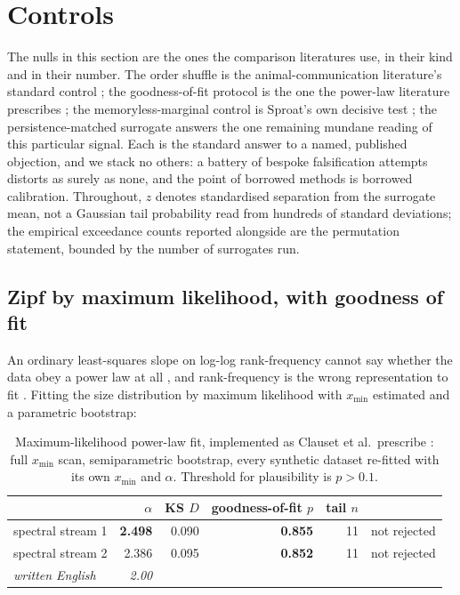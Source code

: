 \documentclass[11pt,a4paper]{article}
\newcommand{\bnum}[1]{\textbf{#1}}
\begin{document}
\section{Controls}

The nulls in this section are the ones the comparison literatures use, in their kind
and in their number. The order shuffle is the animal-communication literature's
standard control \cite{mccowan1999,doyle2011}; the goodness-of-fit protocol is the one
the power-law literature prescribes \cite{clauset2009,corral2020}; the
memoryless-marginal control is Sproat's own decisive test \cite{sproat2014}; the
persistence-matched surrogate answers the one remaining mundane reading of this
particular signal. Each is the standard answer to a named, published objection, and we
stack no others: a battery of bespoke falsification attempts distorts as surely as
none, and the point of borrowed methods is borrowed calibration. Throughout, $z$
denotes standardised separation from the surrogate mean, not a Gaussian tail
probability read from hundreds of standard deviations; the empirical exceedance counts
reported alongside are the permutation statement, bounded by the number of surrogates
run.

\subsection{Zipf by maximum likelihood, with goodness of fit}

An ordinary least-squares slope on log-log rank-frequency cannot say whether the data
obey a power law at all \cite{clauset2009}, and rank-frequency is the wrong
representation to fit \cite{corral2020}. Fitting the size distribution by maximum
likelihood with $x_{\min}$ estimated and a parametric bootstrap:

\begin{table}[htbp]
\centering
\caption{Maximum-likelihood power-law fit, implemented as Clauset et al.\ prescribe
\cite{clauset2009}: full $x_{\min}$ scan, semiparametric bootstrap, every synthetic
dataset re-fitted with its own $x_{\min}$ and $\alpha$. Threshold for plausibility is
$p > 0.1$.}
\label{tab:mle}
\begin{tabular}{lrrrrl}
\toprule
 & $\alpha$ & KS $D$ & goodness-of-fit $p$ & tail $n$ & \\
\midrule
spectral stream 1 & \bnum{2.498} & 0.090 & \bnum{0.855} & 11 & not rejected \\
spectral stream 2 & 2.386 & 0.095 & \bnum{0.852} & 11 & not rejected \\
\emph{written English} & \emph{2.00} & & & & \\
\bottomrule
\end{tabular}
\end{table}
\end{document}
